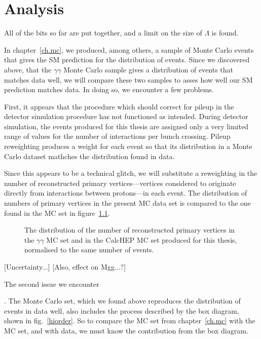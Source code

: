\chapter{Analysis}
All of the bits so far are put together, and a limit on the size of
$\Lambda$ is found.

In chapter~\ref{ch.mc}, we produced, among others, a sample of Monte Carlo events that gives the SM prediction for the distribution of events. Since we discovered above, that the \atlas{} $\gamma\gamma$ Monte Carlo sample gives a distribution of events that matches data well, we will compare these two samples to asses how well our SM prediction matches data. In doing so, we encounter a few problems.

First, it appears that the procedure which should correct for pileup in the detector simulation procedure has not functioned as intended. During detector simulation, the events produced for this thesis are assigned only a very limited range of values for the number of interactions per bunch crossing. Pileup reweighting produces a weight for each event so that its distribution in a Monte Carlo dataset mathches the distribution found in data.

Since this appears to be a technical glitch, we will substitute a reweighting in the number of reconstructed primary vertices---vertices considered to originate directly from interactions between protons---in each event. The distribution of numbers of primary vertices in the present MC data set is compared to the one found in the \atlas{} MC set in figure~\ref{pvnnone}.

\begin{figure}[htp]
\begin{minipage}[b]{.69\textwidth}
\begin{infilsf} \tiny

\end{infilsf}
\end{minipage}
\begin{minipage}[b]{.3\textwidth}
\caption{The distribution of the number of reconstructed primary vertices in the \atlas{} $\gamma\gamma$ MC set and in the CalcHEP MC set produced for this thesis, normalised to the same number of events.}\label{pvnnone}
\end{minipage}
\end{figure}

[Uncertainty...] [Also, effect on Mgg...?]

The second issue we encounter




. The \atlas{} Monte Carlo set, which we found above reproduces the distribution of events in data well, also includes the process described by the box diagram, shown in fig.~\ref{hiorder}. So to compare the MC set from chapter~\ref{ch.mc} with the \atlas{} MC set, and with data, we must know the contribution from the box diagram. 